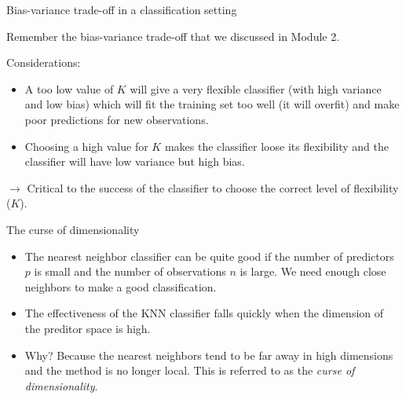 \documentclass[10pt,ignorenonframetext,]{beamer}
\providecommand{\tightlist}{%
  \setlength{\itemsep}{0pt}\setlength{\parskip}{0pt}}
\begin{document}
\begin{frame}

\begin{block}{Bias-variance trade-off in a classification setting}

\vspace{2mm} Remember the bias-variance trade-off that we discussed in
Module 2. \vspace{2mm}

Considerations: \vspace{2mm}

\begin{itemize}
\item
  A too low value of \(K\) will give a very flexible classifier (with
  high variance and low bias) which will fit the training set too well
  (it will overfit) and make poor predictions for new observations.
\item
  Choosing a high value for \(K\) makes the classifier loose its
  flexibility and the classifier will have low variance but high bias.
\end{itemize}

\vspace{2mm}

\(\rightarrow\) Critical to the success of the classifier to choose the
correct level of flexibility (\(K\)).

\end{block}

\end{frame}

\begin{frame}

\begin{block}{The curse of dimensionality}

\vspace{2mm}

\begin{itemize}
\tightlist
\item
  The nearest neighbor classifier can be quite good if the number of
  predictors \(p\) is small and the number of observations \(n\) is
  large. We need enough close neighbors to make a good classification.
\end{itemize}

\vspace{1mm}

\begin{itemize}
\tightlist
\item
  The effectiveness of the KNN classifier falls quickly when the
  dimension of the preditor space is high.
\end{itemize}

\vspace{1mm}

\begin{itemize}
\tightlist
\item
  Why? Because the nearest neighbors tend to be far away in high
  dimensions and the method is no longer local. This is referred to as
  the \emph{curse of dimensionality}.
\end{itemize}

\end{block}

\end{frame}
\end{document}
